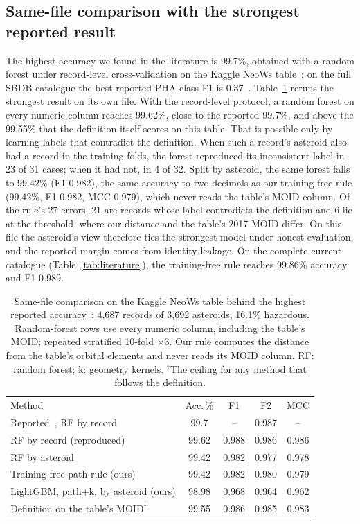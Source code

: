 \documentclass[make,article,submit,moreauthors]{Definitions/mdpi}
\begin{document}
\subsection{Same-file comparison with the strongest reported result}
The highest accuracy we found in the literature is 99.7\%, obtained with a random forest under record-level cross-validation on the Kaggle NeoWs table~\cite{chandra2025}; on the full SBDB catalogue the best reported PHA-class F1 is 0.37~\cite{jacques2025}. Table~\ref{tab:kaggle} reruns the strongest result on its own file. With the record-level protocol, a random forest on every numeric column reaches 99.62\%, close to the reported 99.7\%, and above the 99.55\% that the definition itself scores on this table. That is possible only by learning labels that contradict the definition. When such a record's asteroid also had a record in the training folds, the forest reproduced its inconsistent label in 23 of 31 cases; when it had not, in 4 of 32. Split by asteroid, the same forest falls to 99.42\% (F1 0.982), the same accuracy to two decimals as our training-free rule (99.42\%, F1 0.982, MCC 0.979), which never reads the table's MOID column. Of the rule's 27 errors, 21 are records whose label contradicts the definition and 6 lie at the threshold, where our distance and the table's 2017 MOID differ. On this file the asteroid's view therefore ties the strongest model under honest evaluation, and the reported margin comes from identity leakage. On the complete current catalogue (Table~\ref{tab:literature}), the training-free rule reaches 99.86\% accuracy and F1 0.989.

\begin{table}[t]
\centering
\footnotesize
\caption{Same-file comparison on the Kaggle NeoWs table behind the highest reported accuracy~\cite{kaggle_nasa,chandra2025}: 4,687 records of 3,692 asteroids, 16.1\% hazardous. Random-forest rows use every numeric column, including the table's MOID; repeated stratified 10-fold $\times$3. Our rule computes the distance from the table's orbital elements and never reads its MOID column. RF: random forest; k: geometry kernels. $^\dagger$The ceiling for any method that follows the definition.}
\label{tab:kaggle}
\setlength{\tabcolsep}{2.2pt}
\begin{tabular}{@{}lcccc@{}}
\toprule
Method & Acc.\,\% & F1 & F2 & MCC \\
Reported~\cite{chandra2025}, RF by record & 99.7 & -- & 0.987 & -- \\
\midrule
RF by record (reproduced) & 99.62 & 0.988 & 0.986 & 0.986 \\
RF by asteroid & 99.42 & 0.982 & 0.977 & 0.978 \\
Training-free path rule (ours) & 99.42 & 0.982 & 0.980 & 0.979 \\
LightGBM, path+k, by asteroid (ours) & 98.98 & 0.968 & 0.964 & 0.962 \\
\midrule
Definition on the table's MOID$^\dagger$ & 99.55 & 0.986 & 0.985 & 0.983 \\
\bottomrule
\end{tabular}
\end{table}
\end{document}
